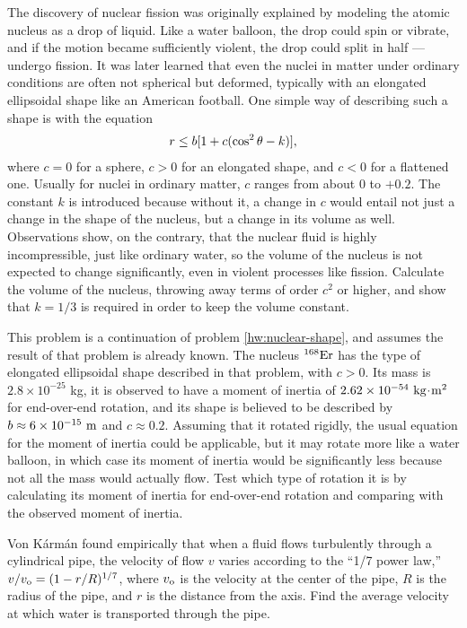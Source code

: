 \begin{hwsection}
\begin{hw}\label{hw:nuclear-shape}
The discovery of nuclear fission
was originally explained by modeling the atomic nucleus as
a drop of liquid. Like a water balloon, the drop could spin or vibrate, and if the motion became
sufficiently violent, the drop could split in half --- undergo fission. It was later learned that
even the nuclei in matter under ordinary conditions are often not
spherical but deformed, typically with an elongated ellipsoidal shape like an American football.
One simple way of describing such a shape is with the equation
\begin{align*}
  r \le b[1+c(\cos^2\theta-k)],
\end{align*}
where $c=0$ for a sphere, $c>0$ for an elongated shape, and $c<0$ for a flattened one.
Usually for nuclei in ordinary matter, $c$ ranges from about 0 to $+0.2$. The constant
$k$ is introduced because without it, a change in $c$ would entail not just a change in
the shape of the nucleus, but a change in its volume as well. Observations show, on the
contrary, that the nuclear fluid is highly incompressible, just like ordinary water, so the
volume of the nucleus is not expected to change significantly, even in violent processes
like fission. Calculate the volume of the nucleus, throwing away terms of order $c^2$
or higher, and show that $k=1/3$ is required in order to keep the volume constant.
\end{hw}

\begin{hw}[2]
This problem is a continuation of problem \ref{hw:nuclear-shape}, and assumes the result of that problem
is already known.
The nucleus $^{168}\textup{Er}$ has the type of elongated ellipsoidal shape described in that
problem, with $c>0$. Its mass is
$2.8\times10^{-25}$ kg, it is observed to have a moment of inertia of $2.62\times10^{-54}\ \textup{kg}\!\cdot\!\textup{m}^2$
for end-over-end rotation, and its shape is believed to be described by $b\approx 6\times10^{-15}\ \textup{m}$ and $c\approx 0.2$.
Assuming that it rotated rigidly, the usual equation for the moment of inertia could be applicable, but
it may rotate more like a water balloon, in which case its moment of inertia would be significantly less because
not all the mass would actually flow. Test which type of rotation it is by calculating its moment of inertia for end-over-end
rotation and comparing with the observed moment of inertia.
\end{hw}

\begin{hw}
Von K\'arm\'an found empirically that when a fluid flows turbulently through a cylindrical pipe, the
velocity of flow $v$ varies according to the ``1/7 power law,'' $v/v_{\textup{o}}=(1-r/R)^{1/7}$, where
$v_{\textup{o}}$ is the velocity at the center of the pipe, $R$ is the radius of the pipe, and $r$ is the
distance from the axis. Find the average velocity at which water is transported through the pipe.
\end{hw}

\end{hwsection}
